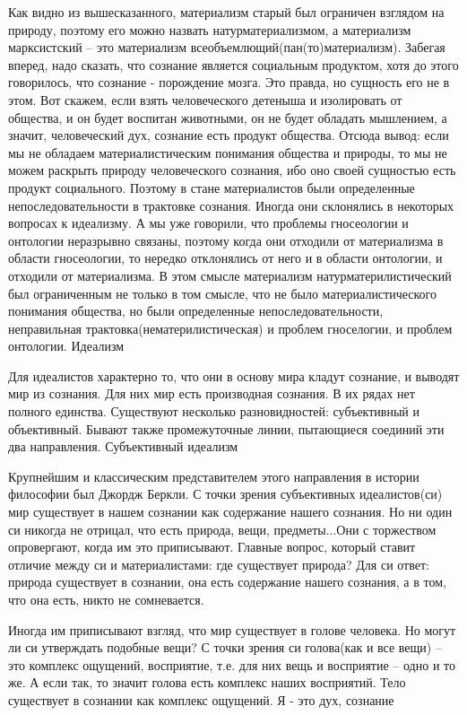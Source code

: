 Как видно из вышесказанного, материализм старый был ограничен взглядом на природу, поэтому его можно назвать натурматериализмом, а материализм марксистский – это материализм всеобъемлющий(пан(то)материализм). Забегая вперед, надо сказать, что сознание является социальным продуктом, хотя до этого говорилось, что сознание - порождение мозга. Это правда, но сущность его не в этом. Вот скажем, если взять человеческого детеныша и изолировать от общества, и он будет воспитан животными, он не будет обладать мышлением, а значит, человеческий дух, сознание есть продукт общества. Отсюда вывод: если мы не обладаем материалистическим понимания общества и природы, то мы не можем раскрыть природу человеческого сознания, ибо оно своей сущностью есть продукт социального. Поэтому в стане материалистов были определенные непоследовательности в трактовке сознания. Иногда они склонялись в некоторых вопросах к идеализму. А мы уже говорили, что проблемы гносеологии и онтологии неразрывно связаны, поэтому когда они отходили от материализма в области гносеологии, то нередко отклонялись от него и в области онтологии, и отходили от материализма. В этом смысле материализм натурматерилистический был ограниченным не только в том смысле, что не было материалистического понимания общества, но были определенные непоследовательности, неправильная трактовка(нематерилистическая) и проблем гноселогии, и проблем онтологии.
Идеализм

Для идеалистов характерно то, что они в основу мира кладут сознание, и выводят мир из сознания. Для них мир есть производная сознания. В их рядах нет полного единства. Существуют несколько разновидностей: субъективный и объективный. Бывают также промежуточные линии, пытающиеся соединий эти два направления.
Субъективный идеализм

Крупнейшим и классическим представителем этого направления в истории философии был Джордж Беркли. С точки зрения субъективных идеалистов(си) мир существует в нашем сознании как содержание нашего сознания. Но ни один си никогда не отрицал, что есть природа, вещи, предметы...Они с торжеством опровергают, когда им это приписывают. Главные вопрос, который ставит отличие между си и материалистами: где существует природа? Для си ответ: природа существует в сознании, она есть содержание нашего сознания, а в том, что она есть, никто не сомневается.

    Иногда им приписывают взгляд, что мир существует в голове человека. Но могут ли си утверждать подобные вещи? С точки зрения си голова(как и все вещи) – это комплекс ощущений, восприятие, т.е. для них вещь и восприятие – одно и то же. А если так, то значит голова есть комплекс наших восприятий. Тело существует в сознании как комплекс ощущений. Я - это дух, сознание

